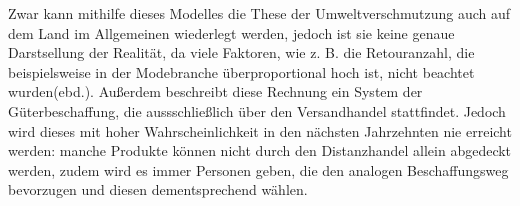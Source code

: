 \begin{folding}
\begin{itemize}
\end{itemize}
Zwar kann mithilfe dieses Modelles die These der Umweltverschmutzung auch auf dem Land im Allgemeinen wiederlegt werden, jedoch ist sie keine genaue Darstsellung der Realität, da viele Faktoren, wie z. B. die Retouranzahl, die beispielsweise in der Modebranche überproportional hoch ist, nicht beachtet wurden(ebd.). Außerdem beschreibt diese Rechnung ein System der Güterbeschaffung, die aussschließlich über den Versandhandel stattfindet. Jedoch wird dieses mit hoher Wahrscheinlichkeit in den nächsten Jahrzehnten nie erreicht werden: manche Produkte können nicht durch den Distanzhandel allein abgedeckt werden, zudem wird es immer Personen geben, die den analogen Beschaffungsweg bevorzugen und diesen dementsprechend wählen.

\end{folding}

